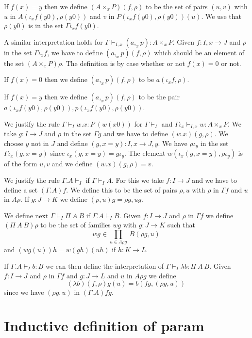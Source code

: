 \documentclass[10pt,a4paper]{article}
\newcommand{\Prod}[2]{\displaystyle\prod _{#1}~#2}
\begin{document}
 If $f(x) = y$ then we define $(A\times_x P)(f,\rho)$ to be the set of pairs
$(u,v)$ with $u$ in $A(\iota_x f(y0),\rho(y0))$ and $v$ in $P(\iota_xf(y0),\rho(y0))(u)$. We use that $\rho(y0)$
is in the set $\Gamma\iota_x f (y0)$.

\medskip
 
 A similar interpretation holds for $\Gamma\vdash_{I,x} (a,_x p):A\times_x P$.
Given $f:I,x\rightarrow J$ and $\rho$ in the set $\Gamma \iota_x f$, we have to define
$(a,_x p)(f,\rho)$ which should be an element of the set $(A\times_x P)\rho$. 
The definition is by case whether or not $f(x) = 0$ or not.

 If $f(x) = 0$ then we define $(a,_xp)(f,\rho)$ to be $a(\iota_xf,\rho)$.

 If $f(x) = y$ then we define $(a,_x p)(f,\rho)$ to be the pair $a(\iota_xf(y0),\rho(y0)),p(\iota_xf(y0),\rho(y0))$.

\medskip

 We justify the rule $\Gamma\vdash_I w.x:P~(w(x0))$ for $\Gamma\vdash_I$
and $\Gamma\iota_x\vdash_{I,x} w:A\times_x P$. We take $g:I\rightarrow J$ and
$\rho$ in the set $\Gamma g$ and we have to define $(w.x)(g,\rho)$.
We choose $y$ not in $J$ and define $(g,x=y):I,x\rightarrow J,y$.
We have $\rho\iota_y$ in the set $\Gamma\iota_x (g,x=y)$ since
$\iota_x (g,x=y) = g\iota_y$. The element $w(\iota_x (g,x=y),\rho\iota_y)$ is of the form
$u,v$ and we define $(w.x)(g,\rho) = v$.

\medskip

 We justify the rule $\Gamma.A\vdash_I$ if $\Gamma\vdash_I A$. For this we take
$f:I\rightarrow J$ and we have to define a set $(\Gamma.A)f$. We define this to be
the set of pairs $\rho,u$ with $\rho$ in $\Gamma f$ and $u$ in $A\rho$.
If $g:J\rightarrow K$ we define $(\rho,u)g = \rho g,ug$.

 We define next $\Gamma\vdash_I \Pi~A~B$ if $\Gamma.A\vdash_I B$. Given $f:I\rightarrow J$
and $\rho$ in $\Gamma f$ we define $(\Pi~A~B)\rho$ to be the set of families
$wg$ with $g:J\rightarrow K$ such that
$$
wg\in \Prod{u\in A\rho g}{B(\rho g,u)}
$$
and $(wg(u))h = w(gh)(uh)$ if $h:K\rightarrow L$.

 If $\Gamma.A\vdash _I b:B$ we can then define the interpretation of
$\Gamma\vdash_I \lambda b:\Pi~A~B$. Given $f:I\rightarrow J$ and
$\rho$ in $\Gamma f$ and $g:J\rightarrow L$ and $u$ in $A\rho g$ we define 
$$
(\lambda b)(f,\rho) g(u) = b(fg,(\rho g,u))
$$
since we have $(\rho g,u)$ in $(\Gamma.A)fg$.


\section{Inductive definition of param}
\end{document}
